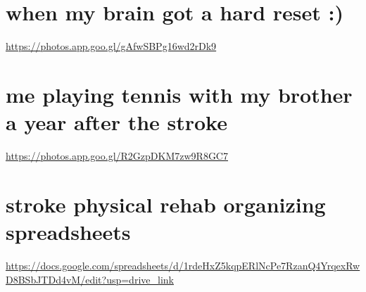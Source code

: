 \documentclass{article}
\begin{document}
\section{when my brain got a hard reset :)}
\url{https://photos.app.goo.gl/gAfwSBPg16wd2rDk9}
\section{me playing tennis with my brother a year after the stroke}
\url{https://photos.app.goo.gl/R2GzpDKM7zw9R8GC7}
\section{stroke physical rehab organizing spreadsheets}
\url{https://docs.google.com/spreadsheets/d/1rdeHxZ5kqpERlNcPe7RzanQ4YrqexRwD8BSbJTDd4vM/edit?usp=drive_link}
\end{document}
